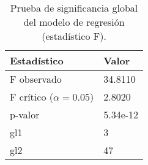 \begin{table}[H]
    \centering
    \color{blue}
    \caption{Prueba de significancia global del modelo de regresión (estadístico F).}
    \label{tab:prueba_f}
    \begin{tabular}{ll}
        \toprule
        Estadístico & Valor \\
        \midrule
        F observado        & 34.8110 \\
        F crítico ($\alpha=0.05$) & 2.8020 \\
        p-valor            & 5.34e-12 \\
        gl1                & 3 \\
        gl2                & 47 \\
        \bottomrule
    \end{tabular}
\end{table}
